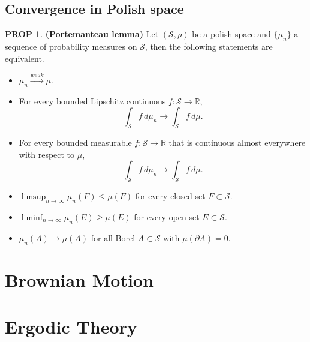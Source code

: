 \documentclass[hidelinks,11pt]{article}
\theoremstyle{definition}
\theoremstyle{dotless}
\newtheorem{prop}{PROP}[section]
\theoremstyle{remark}
\DeclareMathOperator{\1}{\mathbf{1}}
\begin{document}
\subsection{Convergence in Polish space}

\begin{prop}\textup{\textbf{(Portemanteau lemma)}} Let $(\mathcal{S},\rho)$ be a polish space and $\{\mu_n\}$ a sequence of probability measures on $\mathcal{S}$, then the following statements are equivalent.\begin{itemize}
    \item $\mu_n\xrightarrow{weak}\mu$.
    \item For every bounded Lipschitz continuous $f:\mathcal{S}\to\mathbb{R}$,
    \[\int_\mathcal{S}f\,d\mu_n\to\int_\mathcal{S}f\,d\mu.\]
    \item For every bounded measurable $f:\mathcal{S}\to\mathbb{R}$ that is continuous almost everywhere with respect to $\mu$,
    \[\int_\mathcal{S}f\,d\mu_n\to\int_\mathcal{S}f\,d\mu.\]
    \item $\limsup_{n\to\infty}\mu_n(F)\leq\mu(F)$ for every closed set $F\subset\mathcal{S}$.
    \item $\liminf_{n\to\infty}\mu_n(E)\geq\mu(E)$ for every open set $E\subset\mathcal{S}$.
    \item $\mu_n(A)\to\mu(A)$ for all Borel $A\subset\mathcal{S}$ with $\mu(\partial A)=0$.
\end{itemize}
\end{prop}

\section{Brownian Motion}

\section{Ergodic Theory}
\end{document}
